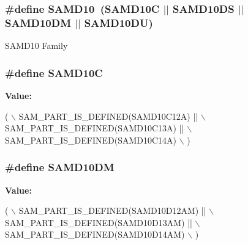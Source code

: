 \subsubsection[{S\+A\+M\+D10}]{\setlength{\rightskip}{0pt plus 5cm}\#define S\+A\+M\+D10~(S\+A\+M\+D10\+C $\vert$$\vert$ S\+A\+M\+D10\+D\+S $\vert$$\vert$ S\+A\+M\+D10\+D\+M $\vert$$\vert$ S\+A\+M\+D10\+D\+U)}\label{group__sam__part__macros__group_gac83f6794433f2c57bfc5c520fe3d67ce}
S\+A\+M\+D10 Family \hypertarget{group__sam__part__macros__group_ga1a60c9b9aa605778737b0f61864f274f}{}
\subsubsection[{S\+A\+M\+D10\+C}]{\setlength{\rightskip}{0pt plus 5cm}\#define S\+A\+M\+D10\+C}\label{group__sam__part__macros__group_ga1a60c9b9aa605778737b0f61864f274f}
{\bfseries Value\+:}
\begin{DoxyCode}
( \(\backslash\)
        SAM\_PART\_IS\_DEFINED(SAMD10C12A) || \(\backslash\)
        SAM\_PART\_IS\_DEFINED(SAMD10C13A) || \(\backslash\)
        SAM\_PART\_IS\_DEFINED(SAMD10C14A) \(\backslash\)
    )
\end{DoxyCode}
\hypertarget{group__sam__part__macros__group_ga99eaa778f98beee6e189a0a649330a47}{}
\subsubsection[{S\+A\+M\+D10\+D\+M}]{\setlength{\rightskip}{0pt plus 5cm}\#define S\+A\+M\+D10\+D\+M}\label{group__sam__part__macros__group_ga99eaa778f98beee6e189a0a649330a47}
{\bfseries Value\+:}
\begin{DoxyCode}
( \(\backslash\)
        SAM\_PART\_IS\_DEFINED(SAMD10D12AM) || \(\backslash\)
        SAM\_PART\_IS\_DEFINED(SAMD10D13AM) || \(\backslash\)
        SAM\_PART\_IS\_DEFINED(SAMD10D14AM) \(\backslash\)
    )
\end{DoxyCode}
\hypertarget{group__sam__part__macros__group_gaad8cc1805b7c030a384ba343b1fc475f}{}
